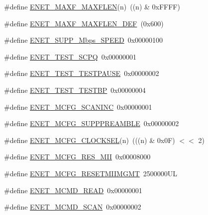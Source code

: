 \begin{DoxyCompactItemize}
\item 
\#define \hyperlink{group__ENET__17XX__40XX_gafa842b5b6e26b8e4890fcedf64d52a9a}{E\-N\-E\-T\-\_\-\-M\-A\-X\-F\-\_\-\-M\-A\-X\-F\-L\-E\-N}(n)~((n) \& 0x\-F\-F\-F\-F)
\item 
\#define \hyperlink{group__ENET__17XX__40XX_ga0b6f202981cfa586090cd4f29b16eaea}{E\-N\-E\-T\-\_\-\-M\-A\-X\-F\-\_\-\-M\-A\-X\-F\-L\-E\-N\-\_\-\-D\-E\-F}~(0x600)
\item 
\#define \hyperlink{group__ENET__17XX__40XX_ga66870c22b0f10f275b7b2c1e6d0709a0}{E\-N\-E\-T\-\_\-\-S\-U\-P\-P\-\_\-Mbps\-\_\-\-S\-P\-E\-E\-D}~0x00000100
\item 
\#define \hyperlink{group__ENET__17XX__40XX_gafa057fdcf20418b56df28532c048f038}{E\-N\-E\-T\-\_\-\-T\-E\-S\-T\-\_\-\-S\-C\-P\-Q}~0x00000001
\item 
\#define \hyperlink{group__ENET__17XX__40XX_gafa31bcfcbdb16b2dbfdc132568826153}{E\-N\-E\-T\-\_\-\-T\-E\-S\-T\-\_\-\-T\-E\-S\-T\-P\-A\-U\-S\-E}~0x00000002
\item 
\#define \hyperlink{group__ENET__17XX__40XX_ga89c6649c9c320cd57d5bc82b1ecf42ee}{E\-N\-E\-T\-\_\-\-T\-E\-S\-T\-\_\-\-T\-E\-S\-T\-B\-P}~0x00000004
\item 
\#define \hyperlink{group__ENET__17XX__40XX_gade8846eaaed89450478cf7e8dd07beb2}{E\-N\-E\-T\-\_\-\-M\-C\-F\-G\-\_\-\-S\-C\-A\-N\-I\-N\-C}~0x00000001
\item 
\#define \hyperlink{group__ENET__17XX__40XX_ga9f39657f690648231761d2aea5aee7cb}{E\-N\-E\-T\-\_\-\-M\-C\-F\-G\-\_\-\-S\-U\-P\-P\-P\-R\-E\-A\-M\-B\-L\-E}~0x00000002
\item 
\#define \hyperlink{group__ENET__17XX__40XX_ga00253a49de1cfbbb4ad88f7563ce5954}{E\-N\-E\-T\-\_\-\-M\-C\-F\-G\-\_\-\-C\-L\-O\-C\-K\-S\-E\-L}(n)~(((n) \& 0x0\-F) $<$$<$ 2)
\item 
\#define \hyperlink{group__ENET__17XX__40XX_gaf31c596c785314febc778a974cefa64e}{E\-N\-E\-T\-\_\-\-M\-C\-F\-G\-\_\-\-R\-E\-S\-\_\-\-M\-I\-I}~0x00008000
\item 
\#define \hyperlink{group__ENET__17XX__40XX_gafd634c8258b41a78b89aff1fa4558996}{E\-N\-E\-T\-\_\-\-M\-C\-F\-G\-\_\-\-R\-E\-S\-E\-T\-M\-I\-I\-M\-G\-M\-T}~2500000\-U\-L
\item 
\#define \hyperlink{group__ENET__17XX__40XX_ga07dfdda78003dd5af6254fc863ae019e}{E\-N\-E\-T\-\_\-\-M\-C\-M\-D\-\_\-\-R\-E\-A\-D}~0x00000001
\item 
\#define \hyperlink{group__ENET__17XX__40XX_ga77d7e45ecfbd3f0bace6900cc69b8beb}{E\-N\-E\-T\-\_\-\-M\-C\-M\-D\-\_\-\-S\-C\-A\-N}~0x00000002
$$
\end{DoxyCompactItemize}
